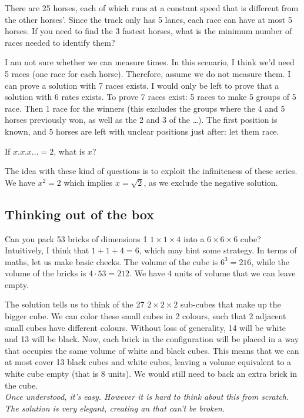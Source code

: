 \begin{qanda} %
    \Q There are 25 horses, each of which runs at a constant speed that is different from the other horses'. 
    Since the track only has 5 lanes, each race can have at most 5 horses. 
    If you need to find the 3 fastest horses, what is the minimum number of races needed to identify them?

    \A I am not sure whether we can measure times. In this scenario, I think we'd need 5 races (one race for each horse).
    Therefore, assume we do not measure them.
    I can prove a solution with 7 races exists. I would only be left to prove that a solution with 6 rates exists.
    To prove 7 races exist: 5 races to make 5 groups of 5 race. Then 1 race for the winners (this excludes the groups where the 4 and 5 horses previously won, as well as the 2 and 3 of the \ldots).
    The first position is known, and 5 horses are left with unclear positions just after: let them race.
\end{qanda}

\begin{qanda}
    \Q If $x \hat{.} x \hat{.} x \dots = 2$, what is $x$?

  \A The idea with these kind of questions is to exploit the infiniteness of these series.
  We have $x^2 = 2$ which implies $x = \sqrt{2}$, as we exclude the negative solution. 
\end{qanda}


\subsection{Thinking out of the box}

\begin{qanda} %
  \Q Can you pack 53 bricks of dimensions 1 $1 \times 1 \times  4$ into a $6 \times 6 \times 6$ cube?
  \A Intuitively, I think that $1 + 1 + 4 = 6$, which may hint some strategy.
  In terms of maths, let us make basic checks. The volume of the cube is $6^3=216$, while the volume of the bricks is $4 \cdot  53 = 212$. We have 4 units of volume that we can leave empty.
  
  The solution tells us to think of the 27 $2 \times 2 \times 2$ sub-cubes that make up the bigger cube. 
  We can color these small cubes in 2 colours, such that 2 adjacent small cubes have different colours. Without loss of generality, 14 will be white and 13 will be black.
  Now, each brick in the configuration will be placed in a way that occupies the same volume of white and black cubes. This means that we can at most cover 13 black cubes and white cubes, leaving a volume equivalent to a white cube empty (that is 8 units). 
  We would still need to back an extra brick in the cube. \\
  \emph{Once understood, it's easy. However it is hard to think about this from scratch. The solution is very elegant, creating an  that can't be broken.}
\end{qanda}

